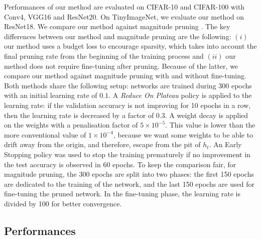 Performances of our method are evaluated on CIFAR-10 and CIFAR-100 with Conv4,
VGG16 and ResNet20. On TinyImageNet, we evaluate our method on ResNet18. We
compare our method against magnitude pruning \cite{DBLP:conf/nips/HanPTD15}. The
key differences between our method and magnitude pruning are the following:
$(i)$ our method uses a budget loss to encourage sparsity, which takes into
account the final pruning rate from the beginning of the training process and
$(ii)$ our method does not require fine-tuning after pruning. Because of the
latter, we compare our method against magnitude pruning with and without
fine-tuning. Both methods share the following setup: networks are trained during
300 epochs with an initial learning rate of $0.1$. A \emph{Reduce On Plateau}
policy is applied to the learning rate: if the validation accuracy is not
improving for 10 epochs in a row, then the learning rate is decreased by a
factor of $0.3$. A weight decay is applied on the weights with a penalisation
factor of $5\times10^{−5}$. This value is lower than the more conventional value
of $1\times10^{-4}$, because we want some weights to be able to drift away from
the origin, and therefore, escape from the pit of $h_t$. An Early Stopping
policy was used to stop the training prematurely if no improvement in the test
accuracy is observed in 60 epochs. To keep the comparison fair, for magnitude
pruning, the 300 epochs are split into two phases: the first 150 epochs are
dedicated to the training of the network, and the last 150 epochs are used for
fine-tuning the pruned network. In the fine-tuning phase, the learning rate is
divided by 100 for better convergence. \\


\subsection{Performances}\label{sec:chap1:performances}

